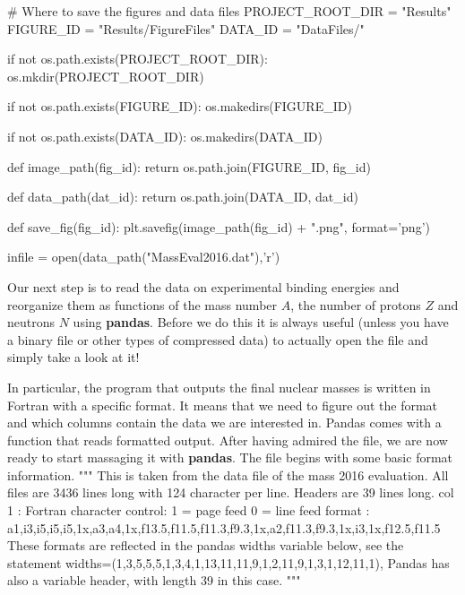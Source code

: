 \documentclass[%
oneside,                 %
final,                   %
10pt]{article}
\begin{document}
# Where to save the figures and data files
PROJECT_ROOT_DIR = "Results"
FIGURE_ID = "Results/FigureFiles"
DATA_ID = "DataFiles/"

if not os.path.exists(PROJECT_ROOT_DIR):
    os.mkdir(PROJECT_ROOT_DIR)

if not os.path.exists(FIGURE_ID):
    os.makedirs(FIGURE_ID)

if not os.path.exists(DATA_ID):
    os.makedirs(DATA_ID)

def image_path(fig_id):
    return os.path.join(FIGURE_ID, fig_id)

def data_path(dat_id):
    return os.path.join(DATA_ID, dat_id)

def save_fig(fig_id):
    plt.savefig(image_path(fig_id) + ".png", format='png')

infile = open(data_path("MassEval2016.dat"),'r')
\epycod



Our next step is to read the data on experimental binding energies and
reorganize them as functions of the mass number $A$, the number of
protons $Z$ and neutrons $N$ using \textbf{pandas}.  Before we do this it is
always useful (unless you have a binary file or other types of compressed
data) to actually open the file and simply take a look at it!


In particular, the program that outputs the final nuclear masses is written in Fortran with a specific format. It means that we need to figure out the format and which columns contain the data we are interested in. Pandas comes with a function that reads formatted output. After having admired the file, we are now ready to start massaging it with \textbf{pandas}. The file begins with some basic format information.
\bpycod
"""                                                                                                                         
This is taken from the data file of the mass 2016 evaluation.                                                               
All files are 3436 lines long with 124 character per line.                                                                  
       Headers are 39 lines long.                                                                                           
   col 1     :  Fortran character control: 1 = page feed  0 = line feed                                                     
   format    :  a1,i3,i5,i5,i5,1x,a3,a4,1x,f13.5,f11.5,f11.3,f9.3,1x,a2,f11.3,f9.3,1x,i3,1x,f12.5,f11.5                     
   These formats are reflected in the pandas widths variable below, see the statement                                       
   widths=(1,3,5,5,5,1,3,4,1,13,11,11,9,1,2,11,9,1,3,1,12,11,1),                                                            
   Pandas has also a variable header, with length 39 in this case.                                                          
"""
\epycod
\end{document}
